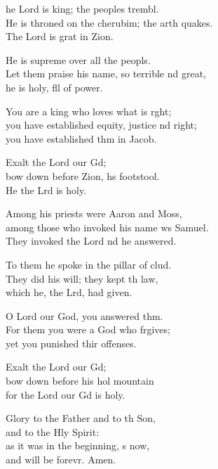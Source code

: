 \settowidth{\versewidth}{He is throned on the cherubim; the earth quakes. *}
\begin{psalmverse}%
  \begin{patverse}
he Lord is king; the peoples trembl.\Flex\\
He is throned on the cherubim; the arth quakes.\Med\\
The Lord is grat in Zion.

He is supreme over all the peopls.\Flex\\
Let them praise his name, so terrible nd great,\Med\\
he is holy, fll of power.

You are a king who loves what is r\pointup{\i}ght;\Flex\\
you have established equity, justice nd right;\Med\\
you have established thm in Jacob.

Exalt the Lord our Gd;\Flex\\
bow down before Zion, h\pointup{\i}s footstool.\Med\\
He the Lrd is holy.

Among his priests were Aaron and Moss,\Flex\\
among those who invoked his name ws Samuel.\Med\\
They invoked the Lord nd he answered.

To them he spoke in the pillar of clud.\Flex\\
They did his will; they kept th law,\Med\\
which he, the Lrd, had given.

O Lord our God, you answered thm.\Flex\\
For them you were a God who frgives;\Med\\
yet you punished thir offenses.

Exalt the Lord our Gd;\Flex\\
bow down before his hol mountain\Med\\
for the Lord our Gd is holy.

Glory to the Father and to th Son,\Med\\
and to the Hly Spirit:\\
as it was in the beginning, \pointup{\i}s now,\Med\\
and will be forevr. Amen.
  \end{patverse}
\end{psalmverse}
